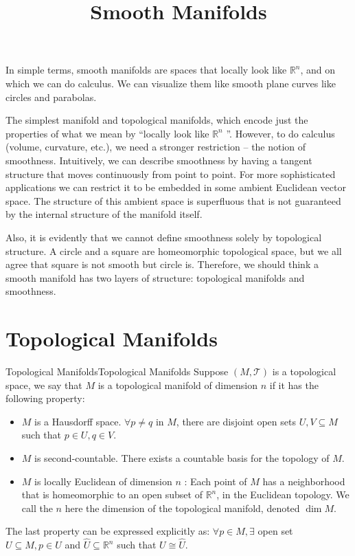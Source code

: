 \documentclass{mathnote}
\title{Smooth Manifolds}
\begin{document}
\maketitle

In simple terms, smooth manifolds are spaces that locally look like $\mathbb{R}^n$, and on which we can do calculus. We can visualize them like smooth plane curves like circles and parabolas.

The simplest manifold and topological manifolds, which encode just the properties of what we mean by ``locally look like $\mathbb{R}^n$ ''. However, to do calculus (volume, curvature, etc.), we need a stronger restriction -- the notion of smoothness. Intuitively, we can describe smoothness by having a tangent structure that moves continuously from point to point. For more sophisticated applications we can restrict it to be embedded in some ambient Euclidean vector space. The structure of this ambient space is superfluous that is not guaranteed by the internal structure of the manifold itself.

Also, it is evidently that we cannot define smoothness solely by topological structure. A circle and a square are homeomorphic topological space, but we all agree that square is not smooth but circle is. Therefore, we should think a smooth manifold has two layers of structure: topological manifolds and smoothness.

\section{Topological Manifolds}
\begin{definition}{Topological Manifolds}{Topological Manifolds}
Suppose $(M,\mathcal{T})$ is a topological space, we say that $M$ is a topological manifold of dimension $n$ if it has the following property:
\begin{itemize}
\item $M$ is a Hausdorff space. $\forall p\neq q$ in $M$, there are disjoint open sets $U,V \subseteq M$ such that $p\in U,q\in V$.
\item $M$ is second-countable. There exists a countable basis for the topology of $M$.
\item $M$ is locally Euclidean of dimension $n$ : Each point of $M$ has a neighborhood that is homeomorphic to an open subset of $\mathbb{R}^n$, in the Euclidean topology. We call the $n$ here the dimension of the topological manifold, denoted $\dim M$.
\end{itemize}

The last property can be expressed explicitly as: $\forall p\in M, \exists$ open set $U \subseteq M,p\in U$ and $\hat{U}\subseteq \mathbb{R}^n$ such that $U \cong \hat{U}$.
\end{definition}
\end{document}
